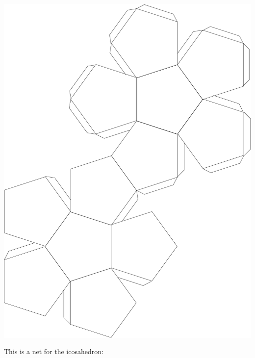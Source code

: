 \centerline{\includegraphics[scale=.5]{images/dodecahedron_template.pdf}}
\bigskip

\newpage

This is a net for the icosahedron:
\bigskip

